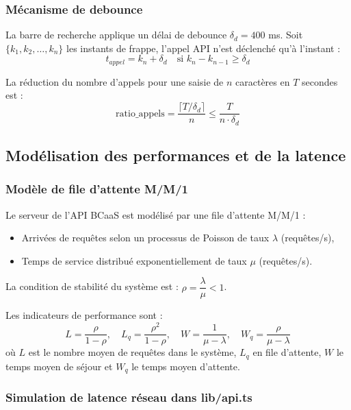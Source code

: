 \documentclass[12pt,a4paper]{report}
\begin{document}
\subsubsection*{Mécanisme de debounce}

La barre de recherche applique un délai de debounce $\delta_d = 400$ ms. Soit $\{k_1, k_2, \ldots, k_n\}$
les instants de frappe, l'appel API n'est déclenché qu'à l'instant :
\[
t_{appel} = k_n + \delta_d \quad \text{si } k_n - k_{n-1} \geq \delta_d
\]

La réduction du nombre d'appels pour une saisie de $n$ caractères en $T$ secondes est :
\[
\text{ratio\_appels} = \frac{\lceil T / \delta_d \rceil}{n} \leq \frac{T}{n \cdot \delta_d}
\]

\subsection{Modélisation des performances et de la latence}

\subsubsection*{Modèle de file d'attente M/M/1}

Le serveur de l'API BCaaS est modélisé par une file d'attente M/M/1 :
\begin{itemize}
  \item Arrivées de requêtes selon un processus de Poisson de taux $\lambda$ (requêtes/s),
  \item Temps de service distribué exponentiellement de taux $\mu$ (requêtes/s).
\end{itemize}

La condition de stabilité du système est : $\rho = \dfrac{\lambda}{\mu} < 1$.

Les indicateurs de performance sont :
\[
L = \frac{\rho}{1 - \rho}, \quad L_q = \frac{\rho^2}{1 - \rho}, \quad W = \frac{1}{\mu - \lambda}, \quad W_q = \frac{\rho}{\mu - \lambda}
\]
où $L$ est le nombre moyen de requêtes dans le système, $L_q$ en file d'attente,
$W$ le temps moyen de séjour et $W_q$ le temps moyen d'attente.

\subsubsection*{Simulation de latence réseau dans lib/api.ts}
\end{document}
